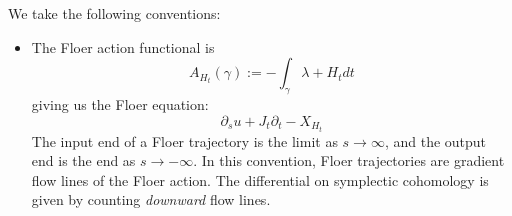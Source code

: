 
We take the following conventions:
\begin{itemize}
    \item The Floer action functional is 
    \[A_{H_t}(\gamma):=-\int_\gamma \lambda+ H_t dt\]
    giving us the Floer equation:
    \[\partial_su +J_t \partial_t -X_{H_t}\]
    The input end of a Floer trajectory is the limit as $s\to\infty$, and the output end is the end as $s\to-\infty$. In this convention, Floer trajectories are gradient flow lines of the Floer action. The differential on symplectic cohomology is given by counting \emph{downward} flow lines.
\end{itemize}
